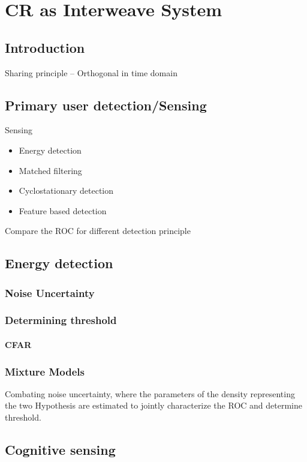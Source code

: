 \chapter{CR as Interweave System}
\label{chap:IS}

\section{Introduction}
Sharing principle -- Orthogonal in time domain 

\section{Primary user detection/Sensing}
Sensing \\ 
\begin{itemize}
\item Energy detection
\item Matched filtering
\item Cyclostationary detection
\item Feature based detection
\end{itemize}
Compare the \ac{ROC} for different detection principle 

\section{Energy detection}
\subsection{Noise Uncertainty}
\subsection{Determining threshold} 
\subsubsection{\ac{CFAR}}

\subsection{Mixture Models}
Combating noise uncertainty, where the parameters of the density representing the two Hypothesis are estimated to jointly characterize the \ac{ROC} and determine threshold. 

\section{Cognitive sensing}

